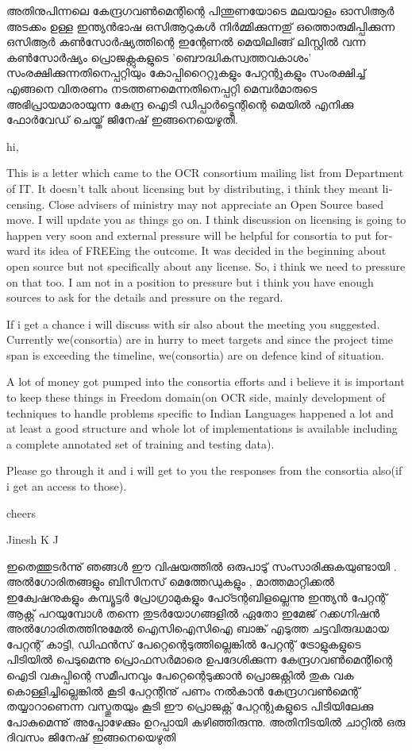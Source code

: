 അതിനുപിന്നലെ കേന്ദ്രഗവണ്‍മെന്റിന്റെ പിന്തുണയോടെ മലയാളം ഓസിആര്‍ അടക്കം ഉള്ള ഇന്ത്യന്‍ഭാഷ ഒസിആറുകള്‍ നിര്‍മ്മിക്കുന്നതു് ഒത്തൊരുമിപ്പിക്കുന്ന  ഒസിആര്‍ കണ്‍സോര്‍ഷ്യത്തിന്റെ  ഇന്റേണല്‍ മെയിലിങ്ങ് ലിസ്റ്റില്‍ വന്ന കണ്‍സോര്‍ഷ്യം  പ്രൊജക്റ്റുകളുടെ 'ബൌദ്ധികസ്വത്തവകാശം' സംരക്ഷിക്കുന്നതിനെപ്പറ്റിയും കോപ്പിറൈറ്റുകളും പേറ്റന്റുകളും സംരക്ഷിച്ച് എങ്ങനെ വിതരണം നടത്തണമെന്നതിനെപ്പറ്റി മെമ്പര്‍മാരുടെ അഭിപ്രായമാരായുന്ന കേന്ദ്ര ഐടി ഡിപ്പാര്‍ട്ട്മെന്റിന്റെ  മെയില്‍ എനിക്കു ഫോര്‍വേഡ് ചെയ്ത് ജിനേഷ് ഇങ്ങനെയെഴുതി.  
\begin{english}
hi,

This is a letter which came to the OCR consortium mailing list from
Department of IT. It doesn't talk about licensing but by distributing, i
think they meant licensing. Close advisers of ministry may not appreciate an
Open Source based move. I will update you as things go on. I think
discussion on licensing is going to happen very soon and external pressure
will be helpful for consortia to put forward its idea of FREEing the
outcome. It was decided in the beginning about open source but not
specifically about any license. So, i think we need to pressure on that too.
I am not in a position to pressure but i think you have enough sources to
ask for the details and pressure on the regard.

If i get a chance i will discuss with sir also about the meeting you
suggested. Currently we(consortia) are in hurry to meet targets and since
the project time span is exceeding the timeline, we(consortia) are on
defence kind of situation.

A lot of money got pumped into the consortia efforts and i believe it is
important to keep these things in Freedom domain(on OCR side, mainly
development of techniques to handle problems specific to Indian Languages
happened a lot and at least a good structure and whole lot of
implementations is available including a complete annotated set of training
and testing data).

Please go through it and i will get to you the responses from the consortia
also(if i get an access to those).

cheers

Jinesh K J
\end{english}

ഇതെത്തുടര്‍ന്നു് ഞങ്ങള്‍ ഈ വിഷയത്തില്‍ ഒരുപാടു് സംസാരിക്കുകയുണ്ടായി . അല്‍ഗോരിതങ്ങളും ബിസിനസ് മെത്തേഡുകളും , മാത്തമാറ്റിക്കല്‍ ഇക്വേഷനുകളും കമ്പ്യൂട്ടര്‍ പ്രോഗ്രാമുകളും പേഠ്ടന്റബിളല്ലെന്നു ഇന്ത്യന്‍ പേറ്റന്റ് ആക്റ്റ് പറയുമ്പോള്‍ തന്നെ തുടര്‍യോഗങ്ങളില്‍ ഏതോ ഇമേജ് റക്കഗ്നിഷന്‍ അല്‍ഗോരിതത്തിനുമേല്‍ ഐസിഐസിഐ ബാങ്ക് എടുത്ത ചട്ടവിരുദ്ധമായ പേറ്റന്റ് കാട്ടി, ഡിഫന്‍സ് പേറ്റെന്റെടുത്തില്ലെങ്കില്‍ പേറ്റന്റ് ട്രോളുകളുടെ പിടിയില്‍ പെടുമെന്നു പ്രൊഫസര്‍മാരെ ഉപദേശിക്കുന്ന കേന്ദ്രഗവണ്‍മെന്റിന്റെ ഐടി വകുപ്പിന്റെ സമീപനവും  പേറ്റെന്റെടുക്കാന്‍ പ്രൊജക്റ്റില്‍ തുക വക കൊള്ളിച്ചില്ലെങ്കില്‍ കൂടി പേറ്റന്റിനു് പണം നല്‍കാന്‍ കേന്ദ്രഗവണ്‍മെന്റ് തയ്യാറാണെന്ന വസ്തുതയും കൂടി ഈ പ്രൊജക്റ്റ് പേറ്റന്റുകളുടെ പിടിയിലേക്കു പോകുമെന്നു് അപ്പോഴേക്കും ഉറപ്പായി കഴിഞ്ഞിരുന്നു. അതിനിടയില്‍ ചാറ്റില്‍ ഒരു ദിവസം ജിനേഷ് ഇങ്ങനെയെഴുതി 

